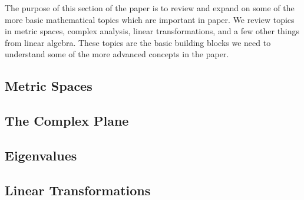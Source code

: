 The purpose of this section of the paper is to review and expand on some of the more basic mathematical topics which are important in \authorsetals paper.  We review topics in metric spaces, complex analysis, linear transformations, and a few other things from linear algebra.  These topics are the basic building blocks we need to understand some of the more advanced concepts in the paper.

\subsection{Metric Spaces}

\newpage
\subsection{The Complex Plane}

\newpage
\subsection{Eigenvalues}

\newpage
\subsection{Linear Transformations}
